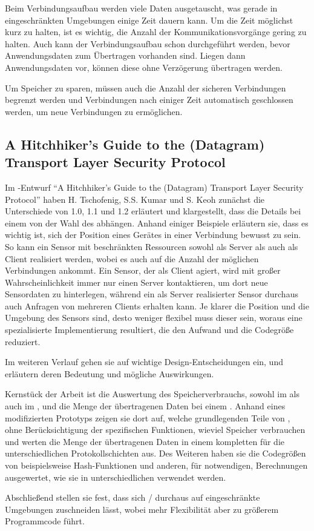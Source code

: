 Beim Verbindungsaufbau werden viele Daten ausgetauscht, was gerade in eingeschränkten Umgebungen einige Zeit dauern kann. Um die Zeit
möglichst kurz zu halten, ist es wichtig, die Anzahl der Kommunikationsvorgänge gering zu halten. Auch kann der Verbindungsaufbau schon
durchgeführt werden, bevor Anwendungsdaten zum Übertragen vorhanden sind. Liegen dann Anwendungsdaten vor, können diese ohne Verzögerung
übertragen werden.

Um Speicher zu sparen, müssen auch die Anzahl der sicheren Verbindungen begrenzt werden und Verbindungen nach einiger Zeit
automatisch geschlossen werden, um neue Verbindungen zu ermöglichen.

\subsection{A Hitchhiker's Guide to the (Datagram) Transport Layer Security Protocol}
Im -Entwurf "`A Hitchhiker's Guide to the (Datagram) Transport Layer Security Protocol"' \cite{draftmintls} haben H. Tschofenig, S.S. Kumar
und S. Keoh zunächst die Unterschiede von  1.0, 1.1 und 1.2 erläutert und klargestellt, dass die Details bei einem  von der Wahl des
 abhängen. Anhand einiger Beispiele erläutern sie, dass es wichtig ist, sich der Position eines Gerätes in einer Verbindung bewusst zu sein.
So kann ein Sensor mit beschränkten Ressourcen sowohl als Server als auch als Client realisiert werden, wobei es auch auf die Anzahl der möglichen
Verbindungen ankommt. Ein Sensor, der als Client agiert, wird mit großer Wahrscheinlichkeit immer nur einen Server kontaktieren, um dort neue Sensordaten
zu hinterlegen, während ein als Server realisierter Sensor durchaus auch Anfragen von mehreren Clients erhalten kann. Je klarer die Position und die
Umgebung des Sensors sind, desto weniger flexibel muss dieser sein, woraus eine spezialisierte Implementierung resultiert, die den Aufwand und die Codegröße reduziert.

Im weiteren Verlauf gehen sie auf wichtige Design-Entscheidungen ein, und erläutern deren Bedeutung und mögliche Auswirkungen.

Kernstück der Arbeit ist die Auswertung des Speicherverbrauchs, sowohl im  als auch im , und die Menge der übertragenen Daten bei einem .
Anhand eines modifizierten Prototyps zeigen sie dort auf, welche grundlegenden Teile von , ohne Berücksichtigung der  spezifischen Funktionen,
wieviel Speicher verbrauchen und werten die Menge der übertragenen Daten in einem kompletten  für die unterschiedlichen Protokollschichten aus.
Des Weiteren haben sie die Codegrößen von beispielsweise Hash-Funktionen und anderen, für  notwendigen, Berechnungen ausgewertet, wie sie in unterschiedlichen
 verwendet werden.

Abschließend stellen sie fest, dass sich / durchaus auf eingeschränkte Umgebungen zuschneiden lässt, wobei mehr Flexibilität aber zu
größerem Programmcode führt. %

